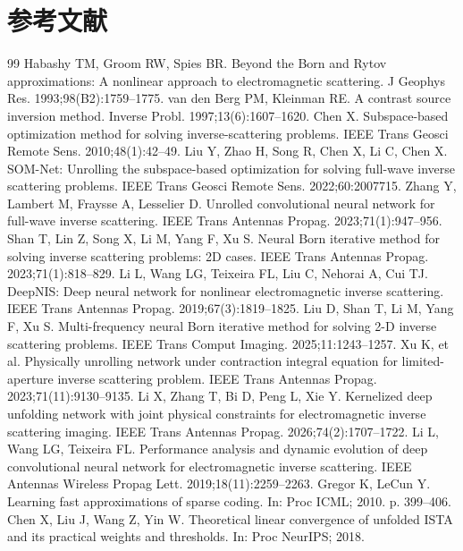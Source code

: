 \documentclass[UTF8,a4paper,11pt]{ctexart}
\begin{document}
\section*{参考文献}
\begin{thebibliography}{99}
Habashy TM, Groom RW, Spies BR. Beyond the Born and Rytov approximations: A nonlinear approach to electromagnetic scattering. J Geophys Res. 1993;98(B2):1759--1775.
van den Berg PM, Kleinman RE. A contrast source inversion method. Inverse Probl. 1997;13(6):1607--1620.
Chen X. Subspace-based optimization method for solving inverse-scattering problems. IEEE Trans Geosci Remote Sens. 2010;48(1):42--49.
Liu Y, Zhao H, Song R, Chen X, Li C, Chen X. SOM-Net: Unrolling the subspace-based optimization for solving full-wave inverse scattering problems. IEEE Trans Geosci Remote Sens. 2022;60:2007715.
Zhang Y, Lambert M, Fraysse A, Lesselier D. Unrolled convolutional neural network for full-wave inverse scattering. IEEE Trans Antennas Propag. 2023;71(1):947--956.
Shan T, Lin Z, Song X, Li M, Yang F, Xu S. Neural Born iterative method for solving inverse scattering problems: 2D cases. IEEE Trans Antennas Propag. 2023;71(1):818--829.
Li L, Wang LG, Teixeira FL, Liu C, Nehorai A, Cui TJ. DeepNIS: Deep neural network for nonlinear electromagnetic inverse scattering. IEEE Trans Antennas Propag. 2019;67(3):1819--1825.
Liu D, Shan T, Li M, Yang F, Xu S. Multi-frequency neural Born iterative method for solving 2-D inverse scattering problems. IEEE Trans Comput Imaging. 2025;11:1243--1257.
Xu K, et al. Physically unrolling network under contraction integral equation for limited-aperture inverse scattering problem. IEEE Trans Antennas Propag. 2023;71(11):9130--9135.
Li X, Zhang T, Bi D, Peng L, Xie Y. Kernelized deep unfolding network with joint physical constraints for electromagnetic inverse scattering imaging. IEEE Trans Antennas Propag. 2026;74(2):1707--1722.
Li L, Wang LG, Teixeira FL. Performance analysis and dynamic evolution of deep convolutional neural network for electromagnetic inverse scattering. IEEE Antennas Wireless Propag Lett. 2019;18(11):2259--2263.
Gregor K, LeCun Y. Learning fast approximations of sparse coding. In: Proc ICML; 2010. p. 399--406.
Chen X, Liu J, Wang Z, Yin W. Theoretical linear convergence of unfolded ISTA and its practical weights and thresholds. In: Proc NeurIPS; 2018.

\end{thebibliography}
\end{document}

